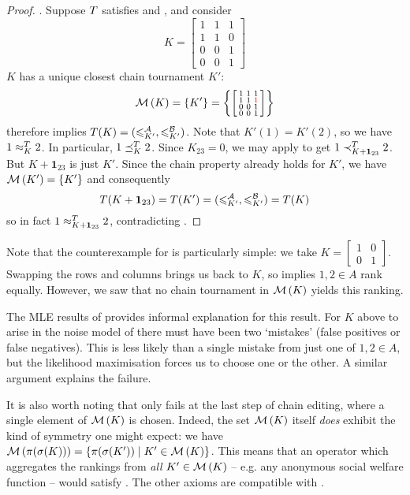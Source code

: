 \begin{proof}
    \posresp{}. Suppose $T$ satisfies \chainmin{} and
    \posresp{}, and consider
    \[
        K = \left[\begin{smallmatrix}
            1 & 1 & 1 \\
            1 & 1 & 0 \\
            0 & 0 & 1 \\
            0 & 0 & 1
        \end{smallmatrix}\right]
    \]
    $K$ has a unique closest chain tournament $K'$:
    \[
        \operatorname{\mathcal{M}}\left({K}\right) = \{K'\} = \left\{
            \left[\begin{smallmatrix}
            1 & 1 & 1 \\
            1 & 1 & \color{red}{1} \\
            0 & 0 & 1 \\
            0 & 0 & 1
        \end{smallmatrix}\right]
        \right\}
    \]
    \chainmin{} therefore implies $T(K) = ({\leqslant^{\mathcal{A}}_{K'}},
    {\leqslant^{\mathcal{B}}_{K'}})$.  Note that $K'(1) = K'(2)$, so we have $1 \approx_K^T 2$.
    In particular, $1 \preceq_K^T 2$. Since $K_{23} = 0$, we may apply
    \posresp{} to get $1 \prec_{K + \bm{1}_{23}}^T 2$.  But $K +
    \bm{1}_{23}$ is just $K'$. Since the chain property already holds for
    $K'$, we have $\operatorname{\mathcal{M}}\left({K'}\right) = \{K'\}$ and consequently
    \[
        T(K + \bm{1}_{23})
        = T(K')
        = ({\leqslant^{\mathcal{A}}_{K'}}, {\leqslant^{\mathcal{B}}_{K'}})
        = T(K)
    \]
    so in fact $1 \approx_{K + \bm{1}_{23}}^T 2$, contradicting
    \posresp{}.
\end{proof}

Note that the counterexample for \anon{} is particularly simple: we
take $K = \left[\begin{smallmatrix} 1&0\\0&1 \end{smallmatrix}\right]$.
    Swapping the rows and columns brings us back to $K$, so \anon{} implies
$1, 2 \in A$ rank equally. However, we saw that no chain tournament in
$\operatorname{\mathcal{M}}\left({K}\right)$ yields this ranking.

The MLE results of  provides informal
explanation for this result. For $K$ above to arise in the noise model of
 there must have been two `mistakes' (false positives or
false negatives). This is less likely than a single mistake from just one of
$1,2 \in A$, but the likelihood maximisation forces us to choose one or the
other. A similar argument explains the \posresp{} failure.

It is also worth noting that \anon{} only fails at the last step of
chain editing, where a single element of $\operatorname{\mathcal{M}}\left({K}\right)$ is chosen. Indeed, the set
$\operatorname{\mathcal{M}}\left({K}\right)$ itself \emph{does} exhibit the kind of symmetry one might expect:
we have $\operatorname{\mathcal{M}}\left({\pi(\sigma(K))}\right) = \{\pi(\sigma(K')) \mid K' \in \operatorname{\mathcal{M}}\left({K}\right)\}$.
This means that an operator which aggregates the rankings from \emph{all} $K'
\in \operatorname{\mathcal{M}}\left({K}\right)$ -- e.g. any anonymous social welfare function --
would satisfy \anon{}. The other axioms are compatible with
\chainmin{}.

